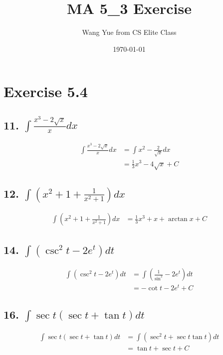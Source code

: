\documentclass{article}
\begin{document}
    \title{MA 5\_3 Exercise}
    \author{Wang Yue from CS Elite Class}
    \date{\today}
    \maketitle
    
    \section*{Exercise 5.4}
    \subsection*{11. $\int \frac{x^3 - 2 \sqrt x}{x} dx$}

    $$\begin{aligned}
        \int \frac{x^3 - 2 \sqrt x}{x}dx &= \int x^2 - \frac{2}{\sqrt x} dx \\
        &= \frac{1}{3} x^3 - 4\sqrt x + C
    \end{aligned}$$

    \subsection*{12. $\int (x^2 + 1 + \frac{1}{x^2 + 1}) dx$}

    $$\begin{aligned}
        \int (x^2 + 1 + \frac{1}{x^2 + 1}) dx &= \frac{1}{3}x^3 + x + \arctan x + C
    \end{aligned}$$

    \subsection*{14. $\int (\csc ^2 t - 2 e^t)dt$}

    $$\begin{aligned}
        \int (\csc^2 t - 2e^t) dt &= \int (\frac{1}{\sin ^2} - 2 e^t) dt \\
        &= -\cot t - 2 e^t + C
    \end{aligned}$$

    \subsection*{16. $\int \sec t(\sec t + \tan t) dt$}

    $$\begin{aligned}
        \int \sec t(\sec t + \tan t) dt &= \int (\sec^2 t + \sec t \tan t)dt \\
        &= \tan t + \sec t + C
    \end{aligned}$$
\end{document}
